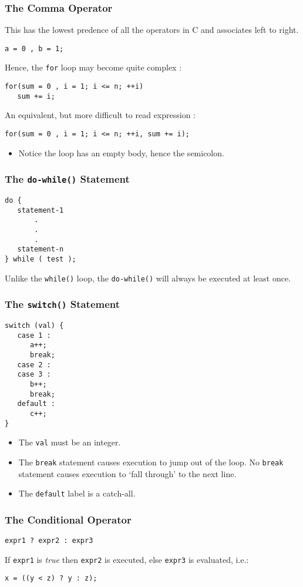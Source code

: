 \begin{frame}[fragile]
\frametitle{The Comma Operator}

This has the lowest predence of all the operators in C
and associates left to right.

\begin{verbatim}
a = 0 , b = 1;
\end{verbatim}

Hence, the \verb^for^ loop may become quite complex :

\begin{verbatim}
for(sum = 0 , i = 1; i <= n; ++i)
   sum += i;
\end{verbatim}

An equivalent, but more difficult to read expression :

{\small
\begin{verbatim}
for(sum = 0 , i = 1; i <= n; ++i, sum += i);
\end{verbatim}
}

\begin{itemize}[<+->]
\item Notice the loop has an empty body, hence the semicolon.
\end{itemize}
\end{frame}

\begin{frame}[fragile]
\frametitle{The {\tt do-while()} Statement}

\begin{verbatim}
do {
   statement-1
       .
       .
       .
   statement-n
} while ( test );
\end{verbatim}

Unlike the \verb^while()^ loop, the \verb^do-while()^ will always
be executed at least once.
\end{frame}

\begin{frame}[fragile]
\frametitle{The {\tt switch()} Statement}

\begin{verbatim}
switch (val) {
   case 1 :
      a++;
      break;
   case 2 :
   case 3 :
      b++;
      break;
   default :
      c++;
}
\end{verbatim}

\begin{itemize}[<+->]
\item The \verb^val^ must be an integer.
\item The \verb^break^ statement causes execution to jump out
of the loop. No \verb^break^ statement causes execution to
`fall through' to the next line.
\item The \verb^default^ label is a catch-all.
\end{itemize}
\end{frame}

\begin{frame}[fragile]
\frametitle{The Conditional Operator}

\begin{verbatim}
expr1 ? expr2 : expr3
\end{verbatim}

If \verb^expr1^ is {\it true} then \verb^expr2^ is executed, else
\verb^expr3^ is evaluated, i.e.:

\verb^x = ((y < z) ? y : z);^
\end{frame}
